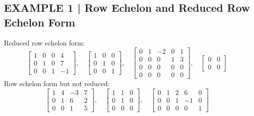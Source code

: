 \documentclass{article}
\theoremstyle{mystyle}
\begin{document}
\subsection*{EXAMPLE 1 | Row Echelon and Reduced Row Echelon Form}
Reduced row echelon form:
\[
\begin{bmatrix}1&0&0&4\\0&1&0&7\\0&0&1&-1\end{bmatrix},\quad
\begin{bmatrix}1&0&0\\0&1&0\\0&0&1\end{bmatrix},\quad
\begin{bmatrix}0&1&-2&0&1\\0&0&0&1&3\\0&0&0&0&0\\0&0&0&0&0\end{bmatrix},\quad
\begin{bmatrix}0&0\\0&0\end{bmatrix}
\]
Row echelon form but not reduced:
\[
\begin{bmatrix}1&4&-3&7\\0&1&6&2\\0&0&1&5\end{bmatrix},\quad
\begin{bmatrix}1&1&0\\0&1&0\\0&0&0\end{bmatrix},\quad
\begin{bmatrix}0&1&2&6&0\\0&0&1&-1&0\\0&0&0&0&1\end{bmatrix}
\]
\end{document}
